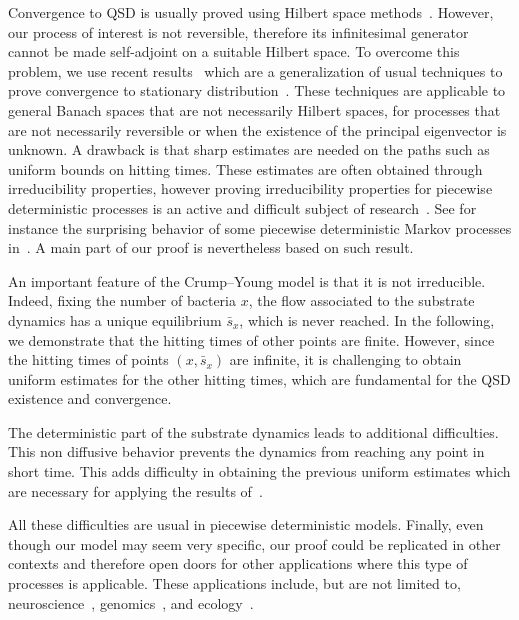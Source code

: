 \documentclass[AHL,Unicode,longabstracts,published]{cedram}
\newcommand{\1}{\mathbf{1}}
\begin{document}
Convergence to QSD is usually proved using Hilbert space methods~\cite{CCLMMS,CMS13,VD91}. However, our process of interest is not reversible, therefore its infinitesimal generator cannot be made self-adjoint on a suitable Hilbert space. To overcome this problem, we use recent results~\cite{BCGM,CG20,CV20,CV17} which are a generalization of usual techniques to prove convergence to stationary distribution~\cite{MT12}. These techniques are applicable to general Banach spaces that are not necessarily Hilbert spaces, for processes that are not necessarily reversible or when the existence of the principal eigenvector is unknown. A drawback is that sharp estimates are needed on the paths such as uniform bounds on hitting times. These estimates are often obtained through irreducibility properties, however proving irreducibility properties for piecewise deterministic processes is an active and difficult subject of research~\cite{BHS18,BLMZ15,BS19,C16}. See for instance the surprising behavior of some piecewise deterministic Markov processes in~\cite{BLMZ14,LMR13}. A main part of our proof is nevertheless based on such result.

An important feature of the Crump--Young model is that it is not irreducible. Indeed, fixing the number of bacteria $x$, the flow associated to the substrate dynamics has a unique equilibrium $\bar s_x$, which is never reached. In the following, we demonstrate that the hitting times of other points are finite. However, since the hitting times of points $(x,\bar s_x)$ are infinite, it is challenging to obtain uniform estimates for the other hitting times, which are fundamental for the QSD existence and convergence.

The deterministic part of the substrate dynamics leads to additional difficulties. This non diffusive behavior prevents the dynamics from reaching any point in short time. This adds difficulty in obtaining the previous uniform estimates which are necessary for applying the results of~\cite{BCGM,CV20}.


All these difficulties are usual in piecewise deterministic models. Finally, even though our model may seem very specific, our proof could be replicated in other contexts and therefore open doors for other applications where this type of processes is applicable. These applications include, but are not limited to, neuroscience~\cite{GL15, PTW}, genomics~\cite{G12, H17}, and ecology~\cite{C16}.
\end{document}
